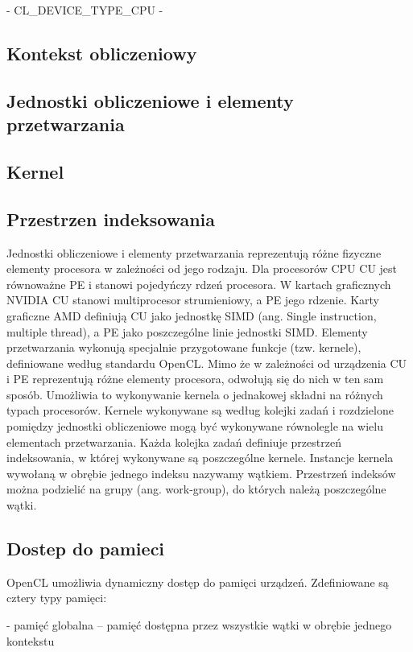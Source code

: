 - CL_DEVICE_TYPE_CPU - 

\subsection{Kontekst obliczeniowy}\label{sec:OpenC2L}


\subsection{Jednostki obliczeniowe i elementy przetwarzania}\label{sec:OpenC3L}
\subsection{Kernel}\label{sec:OpenC4L}
\subsection{Przestrzen indeksowania}\label{sec:OpenC5L}
Jednostki obliczeniowe i elementy przetwarzania reprezentują różne fizyczne elementy procesora w zależności od jego rodzaju. Dla procesorów CPU CU jest równoważne PE i stanowi pojedyńczy rdzeń procesora. W kartach graficznych NVIDIA CU stanowi multiprocesor strumieniowy, a PE jego rdzenie. Karty graficzne AMD definiują CU jako jednostkę SIMD (ang. Single instruction, multiple thread), a PE jako poszczególne linie jednostki SIMD. Elementy przetwarzania wykonują specjalnie przygotowane funkcje (tzw. kernele), definiowane według standardu OpenCL. Mimo że w zależności od urządzenia CU i PE reprezentują różne elementy procesora, odwołują się do nich w ten sam sposób. Umożliwia to wykonywanie  kernela o jednakowej składni na różnych typach procesorów. Kernele wykonywane są według kolejki zadań i rozdzielone pomiędzy jednostki obliczeniowe mogą być wykonywane równolegle na wielu elementach przetwarzania. Każda kolejka zadań definiuje przestrzeń indeksowania, w której wykonywane są poszczególne kernele.  Instancje kernela wywołaną w obrębie jednego indeksu nazywamy wątkiem. Przestrzeń indeksów można podzielić na grupy (ang. work-group), do których należą poszczególne wątki.

\subsection{Dostep do pamieci}\label{sec:OpenC6L}

OpenCL umożliwia dynamiczny dostęp do pamięci urządzeń. Zdefiniowane są cztery typy pamięci:

- pamięć globalna – pamięć dostępna przez wszystkie wątki w obrębie jednego kontekstu

